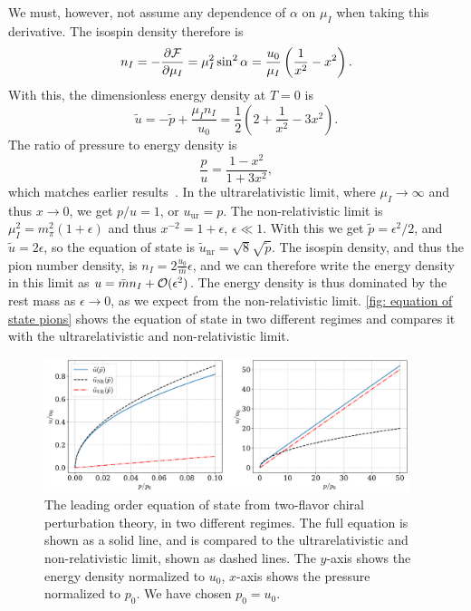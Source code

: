 We must, however, not assume any dependence of $\alpha$ on $\mu_I$ when taking this derivative.
The isospin density therefore is
%
\begin{equation}
    n_I = -\pdv{\mathcal{F}}{\mu_I} = \mu_I^2 \sin^2 \alpha 
    = 
    \frac{u_0}{\mu_I} \left(\frac{1}{x^2} - x^2\right).
\end{equation}
%
With this, the dimensionless energy density at $T = 0$ is
%
\begin{equation}
    \label{energy density leading order chpt}
    \tilde u = - \tilde p + \frac{\mu_I n_I}{u_0}
    = \frac{1}{2} \left( 2 + \frac{1}{x^2} - 3 x^2\right).
\end{equation}
% 
The ratio of pressure to energy density is
%
\begin{equation} 
    \label{pressure energy ratio leading order chpt}
    \frac{p}{u} = \frac{1- x^2}{1+3x^2},
\end{equation}
%
which matches earlier results~\autocite{sonQCDFiniteIsospin2001}.
In the ultrarelativistic limit, where $\mu_I \rightarrow \infty$ and thus $x \rightarrow 0$, we get $p / u = 1$, or $u_\text{ur} = p$.
The non-relativistic limit is $\mu_I^2 = m_\pi^2(1 + \epsilon)$ and thus $x^{-2} = 1 + \epsilon$, $\epsilon \ll 1$.
With this we get $\tilde p = \epsilon^2 / 2 $, and $\tilde u = 2\epsilon$, so the equation of state is $\tilde u_\text{nr} = \sqrt 8 \sqrt{\tilde p}$.
The isospin density, and thus the pion number density, is $n_I = 2 \frac{u_0}{\bar m} \epsilon$, and we can therefore write the energy density in this limit as $u = \bar m n_I + \mathcal O(\epsilon^2)$.
The energy density is thus dominated by the rest mass as $\epsilon \rightarrow 0$, as we expect from the non-relativistic limit.
\autoref{fig: equation of state pions} shows the equation of state in two different regimes and compares it with the ultrarelativistic and non-relativistic limit.

\begin{figure}[h]
    \centering
    \includegraphics[width=0.95\textwidth]{../scripts/figurer/pion_star/pion_eos.pdf}
    \caption{
        The leading order equation of state from two-flavor chiral perturbation theory, in two different regimes.
        The full equation is shown as a solid line, and is compared to the ultrarelativistic and non-relativistic limit, shown as dashed lines. 
        The $y$-axis shows the energy density normalized to $u_0$, $x$-axis shows the pressure normalized to $p_0$.
        We have chosen $p_0 = u_0$.
    }
    \label{fig: equation of state pions}
\end{figure}



